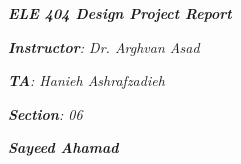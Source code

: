 

\begin{titlepage}
    \begin{center}
        \vspace*{1cm}
            
        \date{}
            
        \huge
            
        \textit{\textbf{ELE 404 Design Project Report}}
            
        \vspace{0.25cm}
        
        \vspace{2.5cm}
            
            
            
		\vspace{0.25cm}
            
            
        \LARGE
            

		\textit{\textbf{Instructor}: Dr. Arghvan Asad}

		\textit{\textbf{TA}: Hanieh Ashrafzadieh}

		\textit{\textbf{Section}: 06}

		\vspace{2.5cm}

		\vspace{2.5cm}
		
		\vspace{1.5cm}

		\textit{\textbf{Sayeed Ahamad}}
            
            
        \Large         


		\vspace{0cm}            

		\vspace{1cm}
            

\end{center}
\end{titlepage}
